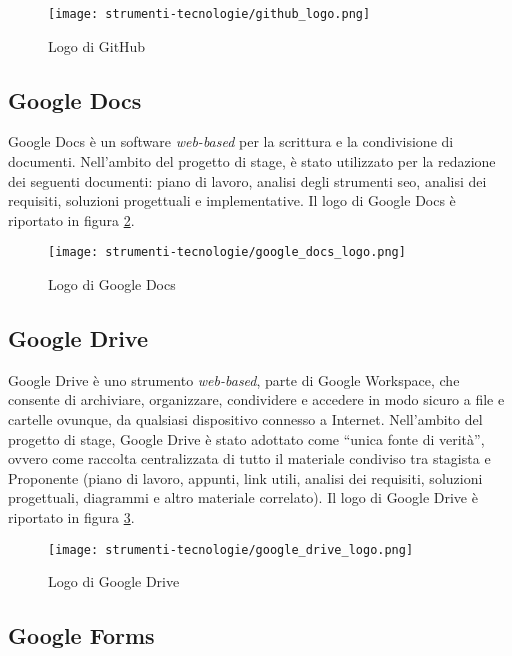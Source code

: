 \begin{figure}[H]
  \centering 
  \texttt{[image: strumenti-tecnologie/github\_logo.png]} 
  \caption{Logo di GitHub}
  \label{fig:logo_github}
\end{figure}

\subsection*{Google Docs}

Google Docs è un software \textit{web-based} per la scrittura e la condivisione di documenti. Nell’ambito del progetto di stage, è stato utilizzato per la redazione dei seguenti documenti: piano di lavoro, analisi degli strumenti \gls{seo}, analisi dei \gls{requisiti}, soluzioni progettuali e implementative. Il logo di Google Docs è riportato in figura \ref{fig:logo_google_docs}.

\begin{figure}[H]
  \centering 
  \texttt{[image: strumenti-tecnologie/google\_docs\_logo.png]} 
  \caption{Logo di Google Docs}
  \label{fig:logo_google_docs}
\end{figure}

\subsection*{Google Drive}

Google Drive è uno strumento \textit{web-based}, parte di Google Workspace, che consente di archiviare, organizzare, condividere e accedere in modo sicuro a file e cartelle ovunque, da qualsiasi dispositivo connesso a Internet. Nell’ambito del progetto di stage, Google Drive è stato adottato come “unica fonte di verità”, ovvero come raccolta centralizzata di tutto il materiale condiviso tra stagista e Proponente (piano di lavoro, appunti, link utili, analisi dei \gls{requisiti}, soluzioni progettuali, diagrammi e altro materiale correlato). Il logo di Google Drive è riportato in figura \ref{fig:logo_google_drive}.

\begin{figure}[H]
  \centering 
  \texttt{[image: strumenti-tecnologie/google\_drive\_logo.png]}  
  \caption{Logo di Google Drive}
  \label{fig:logo_google_drive}
\end{figure}

\subsection*{Google Forms}

